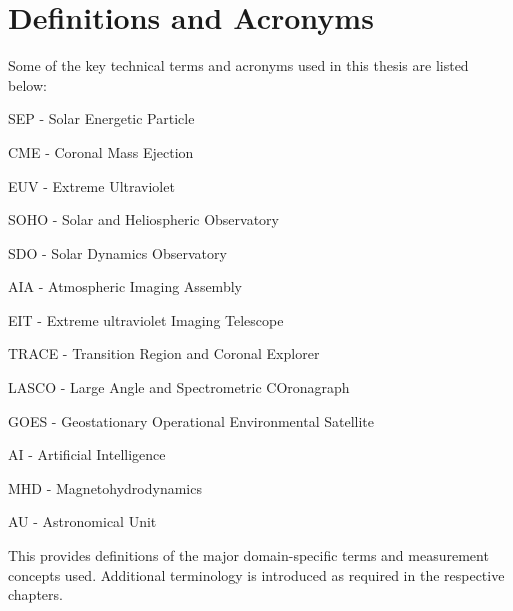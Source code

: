 \section{Definitions and Acronyms}
Some of the key technical terms and acronyms used in this thesis are listed below:

SEP - Solar Energetic Particle

CME - Coronal Mass Ejection 

EUV - Extreme Ultraviolet

SOHO - Solar and Heliospheric Observatory

SDO - Solar Dynamics Observatory

AIA - Atmospheric Imaging Assembly 

EIT - Extreme ultraviolet Imaging Telescope

TRACE - Transition Region and Coronal Explorer

LASCO - Large Angle and Spectrometric COronagraph

GOES - Geostationary Operational Environmental Satellite

AI - Artificial Intelligence

MHD - Magnetohydrodynamics

AU - Astronomical Unit

This provides definitions of the major domain-specific terms and measurement concepts used. Additional terminology is introduced as required in the respective chapters.

